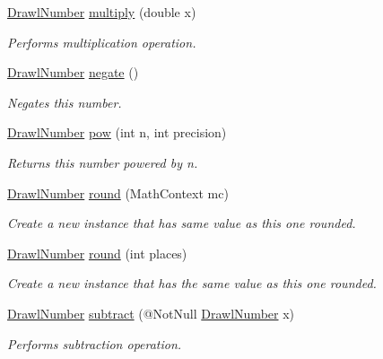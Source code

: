 \begin{DoxyCompactItemize}
\hyperlink{classcom_1_1aarrelaakso_1_1drawl_1_1_drawl_number}{Drawl\+Number} \hyperlink{classcom_1_1aarrelaakso_1_1drawl_1_1_drawl_number_a8eb1872ac149fcad193f46fc8a6fa0ad}{multiply} (double x)
\begin{DoxyCompactList}\small\item\em Performs multiplication operation. \end{DoxyCompactList}\item 
\hyperlink{classcom_1_1aarrelaakso_1_1drawl_1_1_drawl_number}{Drawl\+Number} \hyperlink{classcom_1_1aarrelaakso_1_1drawl_1_1_drawl_number_a1093e80c570f85142255528e4d31820d}{negate} ()
\begin{DoxyCompactList}\small\item\em Negates this number. \end{DoxyCompactList}\item 
\hyperlink{classcom_1_1aarrelaakso_1_1drawl_1_1_drawl_number}{Drawl\+Number} \hyperlink{classcom_1_1aarrelaakso_1_1drawl_1_1_drawl_number_aa88990d915ee2e7997180d96bb7b6312}{pow} (int n, int precision)
\begin{DoxyCompactList}\small\item\em Returns this number powered by n. \end{DoxyCompactList}\item 
\hyperlink{classcom_1_1aarrelaakso_1_1drawl_1_1_drawl_number}{Drawl\+Number} \hyperlink{classcom_1_1aarrelaakso_1_1drawl_1_1_drawl_number_a1f95d60be39632cb888dab572894822f}{round} (Math\+Context mc)
\begin{DoxyCompactList}\small\item\em Create a new instance that has same value as this one rounded. \end{DoxyCompactList}\item 
\hyperlink{classcom_1_1aarrelaakso_1_1drawl_1_1_drawl_number}{Drawl\+Number} \hyperlink{classcom_1_1aarrelaakso_1_1drawl_1_1_drawl_number_ac5efac0046896d23bab3569661a2d32c}{round} (int places)
\begin{DoxyCompactList}\small\item\em Create a new instance that has the same value as this one rounded. \end{DoxyCompactList}\item 
\hyperlink{classcom_1_1aarrelaakso_1_1drawl_1_1_drawl_number}{Drawl\+Number} \hyperlink{classcom_1_1aarrelaakso_1_1drawl_1_1_drawl_number_a4a9de57548307feaf7e703e5428422f5}{subtract} (@Not\+Null \hyperlink{classcom_1_1aarrelaakso_1_1drawl_1_1_drawl_number}{Drawl\+Number} x)
\begin{DoxyCompactList}\small\item\em Performs subtraction operation. \end{DoxyCompactList}\item 

\end{DoxyCompactItemize}
